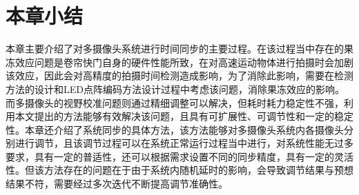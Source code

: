 \section{本章小结}

本章主要介绍了对多摄像头系统进行时间同步的主要过程。在该过程当中存在的果冻效应问题是卷帘快门自身的硬件性能所致，在对高速运动物体进行拍摄时会加剧该效应，因此会对高精度的拍摄时间检测造成影响，为了消除此影响，需要在检测方法的设计和LED点阵编码方法设计过程中考虑该问题，消除果冻效应的影响。而多摄像头的视野校准问题则通过精细调整可以解决，但耗时耗力稳定性不强，利用本文提出的方法能够有效解决该问题，且具有可扩展性、可调节性和一定的稳定性。本章还介绍了系统同步的具体方法，该方法能够对多摄像头系统内各摄像头分别进行调节，且该调节过程可以在系统正常运行过程当中进行，对系统性能无过多要求，具有一定的普适性，还可以根据需求设置不同的同步精度，具有一定的灵活性。但该方法存在的问题在于由于系统内随机延时的影响，会导致调节结果与预想结果不符，需要经过多次迭代不断提高调节准确性。




















































































